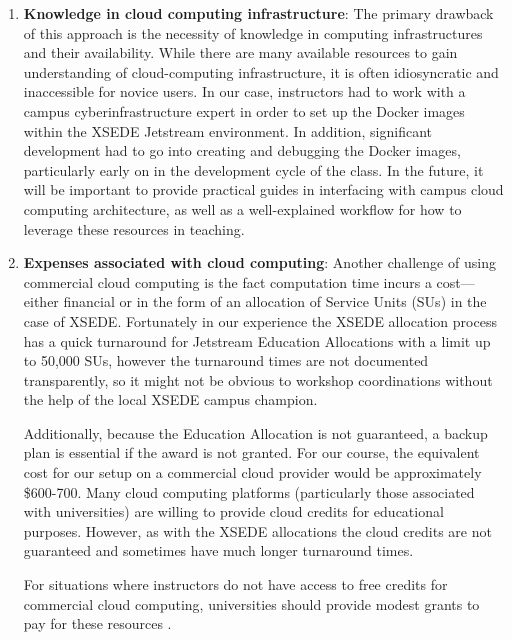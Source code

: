 \begin{enumerate}

\item {\bf Knowledge in cloud computing infrastructure}: The primary drawback of
this approach is the necessity of knowledge in computing infrastructures and
their availability. While there are many available resources to gain
understanding of cloud-computing infrastructure, it is often idiosyncratic and
inaccessible for novice users. In our case, instructors had to work with a
campus cyberinfrastructure expert in order to set up the Docker images within
the XSEDE Jetstream environment. In addition, significant development had to go
into creating and debugging the Docker images, particularly early on in the
development cycle of the class. In the future, it will be important to provide
practical guides in interfacing with campus cloud computing architecture, as
well as a well-explained workflow for how to leverage these resources in
teaching.

\item {\bf Expenses associated with cloud computing}: Another challenge of using
commercial cloud computing is the fact computation time incurs a cost— either
financial or in the form of an allocation of Service Units (SUs) in the case of
XSEDE. Fortunately in our experience the XSEDE allocation process has a quick
turnaround for Jetstream Education Allocations with a limit up to 50,000 SUs,
however the turnaround times are not documented transparently, so it might not
be obvious to workshop coordinations without the help of the local XSEDE campus
champion.

Additionally, because the Education Allocation is not guaranteed, a backup plan
is essential if the award is not granted. For our course, the equivalent cost
for our setup on a commercial cloud provider would be approximately \$600-700.
Many cloud computing platforms (particularly those associated with universities)
are willing to provide cloud credits for educational purposes. However, as with
the XSEDE allocations the cloud credits are not guaranteed and sometimes have
much longer turnaround times.

For situations where instructors do not have access to free credits for
commercial cloud computing, universities should provide modest grants to pay for
these resources .


\end{enumerate}
